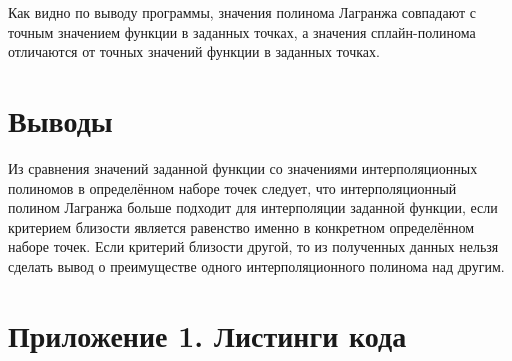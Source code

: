 Как видно по выводу программы, значения полинома Лагранжа совпадают с точным значением функции в заданных точках, а значения сплайн-полинома отличаются от точных значений функции в заданных точках.

\section{Выводы}
Из сравнения значений заданной функции со значениями интерполяционных полиномов в определённом наборе точек следует, что интерполяционный полином Лагранжа больше подходит для интерполяции заданной функции, если критерием близости является равенство именно в конкретном определённом наборе точек. Если критерий близости другой, то из полученных данных нельзя сделать вывод о преимуществе одного интерполяционного полинома над другим.

\newpage

\section*{Приложение 1. Листинги кода} \label{sec:appendix1}


\parindent=1cm %


\parindent=1cm %


\parindent=1cm %


\parindent=1cm %


\parindent=1cm %


